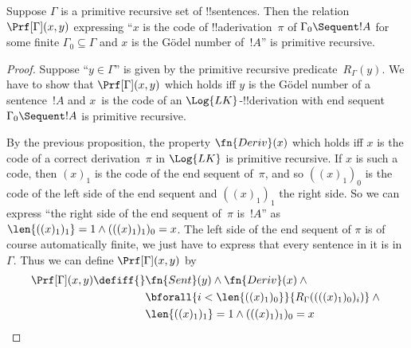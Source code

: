 \documentclass[../../../include/open-logic-section]{subfiles}
\begin{document}
\begin{prop}
Suppose $\Gamma$ is a primitive recursive set of !!{sentence}s.  Then
the relation $\Prf[\Gamma](x, y)$ expressing ``$x$ is the code of
!!a{derivation}~$\pi$ of $\Gamma_0 \Sequent !A$ for some finite
$\Gamma_0 \subseteq \Gamma$ and $x$ is the G\"odel number of~$!A$'' is
primitive recursive.
\end{prop}

\begin{proof}
Suppose ``$y \in \Gamma$'' is given by the primitive recursive
predicate~$R_\Gamma(y)$.  We have to show that $\Prf[\Gamma](x, y)$
which holds iff $y$ is the G\"odel number of a sentence~$!A$ and
$x$~is the code of an $\Log{LK}$-!!{derivation} with end sequent
$\Gamma_0 \Sequent !A$ is primitive recursive.

By the previous proposition, the property $\fn{Deriv}(x)$ which holds
iff $x$ is the code of a correct derivation~$\pi$ in $\Log{LK}$ is
primitive recursive.  If $x$ is such a code, then $(x)_1$ is the code
of the end sequent of~$\pi$, and so $((x)_1)_0$ is the code of the
left side of the end sequent and $((x)_1)_1$ the right side.  So we can
express ``the right side of the end sequent of~$\pi$ is~$!A$'' as
$\len{((x)_1)_1} = 1 \land (((x)_1)_1)_0 = x$.  The left side of the
end sequent of $\pi$ is of course automatically finite, we just have
to express that every sentence in it is in~$\Gamma$.  Thus we can
define $\Prf[\Gamma](x, y)$ by
\begin{align*}
\Prf[\Gamma](x, y) \defiff {}&
\fn{Sent}(y) \land \fn{Deriv}(x) \land {} \\
& \bforall{i <
  \len{((x)_1)_0}}{R_\Gamma((((x)_1)_0)_i)} \land {}\\
& \len{((x)_1)_1} = 1 \land (((x)_1)_1)_0 = x
\end{align*}
\end{proof}
\end{document}

